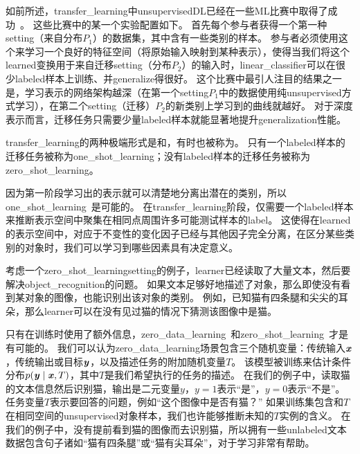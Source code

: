 
如前所述，\gls{transfer_learning}中\gls{unsupervised}\gls{DL}已经在一些\gls{ML}比赛中取得了成功~\citep{UTLC+LISA-2011-small,goodfellow+all-NIPS2011}。
这些比赛中的某一个实验配置如下。
首先每个参与者获得一个第一种\gls{setting}（来自分布$P_1$）的数据集，其中含有一些类别的样本。
参与者必须使用这个来学习一个良好的特征空间（将原始输入映射到某种表示），使得当我们将这个\gls{learned}变换用于来自迁移\gls{setting}（分布$P_2$）的输入时，\gls{linear_classifier}可以在很少\gls{labeled}样本上训练、并\gls{generalize}得很好。
这个比赛中最引人注目的结果之一是，学习表示的网络架构越深（在第一个\gls{setting}$P_1$中的数据使用纯\gls{unsupervised}方式学习），在第二个\gls{setting}（迁移）$P_2$的新类别上学习到的曲线就越好。
对于深度表示而言，迁移任务只需要少量\gls{labeled}样本就能显著地提升\gls{generalization}性能。


\gls{transfer_learning}的两种极端形式是和，有时也被称为。
只有一个\gls{labeled}样本的迁移任务被称为\gls{one_shot_learning}；没有\gls{labeled}样本的迁移任务被称为\gls{zero_shot_learning}。


因为第一阶段学习出的表示就可以清楚地分离出潜在的类别，所以\gls{one_shot_learning}~\citep{Fei-Fei+al-2006}是可能的。
在\gls{transfer_learning}阶段，仅需要一个\gls{labeled}样本来推断表示空间中聚集在相同点周围许多可能测试样本的\gls{label}。
这使得在\gls{learned}的表示空间中，对应于不变性的变化因子已经与其他因子完全分离，在区分某些类别的对象时，我们可以学习到哪些因素具有决定意义。


考虑一个\gls{zero_shot_learning}\gls{setting}的例子，\gls{learner}已经读取了大量文本，然后要解决\gls{object_recognition}的问题。
如果文本足够好地描述了对象，那么即使没有看到某对象的图像，也能识别出该对象的类别。
例如，已知猫有四条腿和尖尖的耳朵，那么\gls{learner}可以在没有见过猫的情况下猜测该图像中是猫。



只有在训练时使用了额外信息，\gls{zero_data_learning}~\citep{Larochelle2008}和\gls{zero_shot_learning}~\citep{Palatucci2009,Socher-2013}才是有可能的。
我们可以认为\gls{zero_data_learning}场景包含三个随机变量：传统输入$\boldsymbol{\mathit{x}}$，传统输出或目标$\boldsymbol{\mathit{y}}$，以及描述任务的附加随机变量$T$。
该模型被训练来估计条件分布$p(\boldsymbol{\mathit{y}} \mid \boldsymbol{\mathit{x}}, T)$，其中$T$是我们希望执行的任务的描述。
在我们的例子中，读取猫的文本信息然后识别猫，输出是二元变量$y$，$y=1$表示``是''，$y=0$表示``不是''。
任务变量$T$表示要回答的问题，例如``这个图像中是否有猫？''
如果训练集包含和$T$在相同空间的\gls{unsupervised}对象样本，我们也许能够推断未知的$T$实例的含义。
在我们的例子中，没有提前看到猫的图像而去识别猫，所以拥有一些\gls{unlabeled}文本数据包含句子诸如``猫有四条腿''或``猫有尖耳朵''，对于学习非常有帮助。

